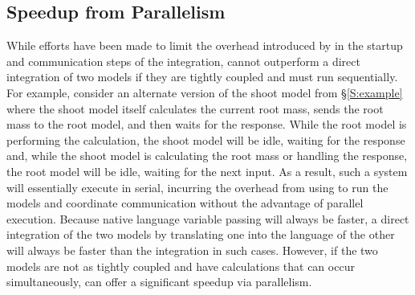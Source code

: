 \documentclass[journal]{IEEEtran}
\newcommand{\todo}[1]{{\color{red}{#1}}}
\newcommand{\pkg}{{\tt \todo{cis\_interface}}{}}
\begin{document}
\subsection{Speedup from Parallelism}\label{SS:speedup}
%
While efforts have been made to limit the overhead introduced by {\pkg} in the startup and communication steps of the integration, {\pkg} cannot outperform a direct integration of two models if they are tightly coupled and must run sequentially. For example, consider an alternate version of the shoot model from \S\ref{S:example} where the shoot model itself calculates the current root mass, sends the root mass to the root model, and then waits for the response. While the root model is performing the calculation, the shoot model will be idle, waiting for the response and, while the shoot model is calculating the root mass or handling the response, the root model will be idle, waiting for the next input. As a result, such a system will essentially execute in serial, incurring the overhead from using {\pkg} to run the models and coordinate communication without the advantage of parallel execution. Because native language variable passing will always be faster, a direct integration of the two models by translating one into the language of the other will always be faster than the {\pkg} integration in such cases. However, if the two models are not as tightly coupled and have calculations that can occur simultaneously, {\pkg} can offer a significant speedup via parallelism.
\end{document}
